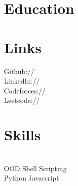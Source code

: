 \documentclass[]{deedy-resume-openfont}
\begin{document}
%
%
\lastupdated

%
%



%
%

\begin{minipage}[t]{0.33\textwidth} 


\section{Education} 

\sectionsep



\section{Links} 
Github:// \href{https://github.com/llucifer97}{} \\
LinkedIn://  \href{https://www.linkedin.com/in/ayush-raj97/}{} \\
Codeforces://  \href{https://codeforces.com/profile/ayush_raj97}{} \\
Leetcode://  \href{https://leetcode.com/llucifer97/}{}
\sectionsep



\section{Skills}
\\
 \textbullet{} OOD  \textbullet{} Shell Scripting\\
 \textbullet{} Python 
   \textbullet{} Javascript\\
   \\


\end{minipage}
\end{document}
